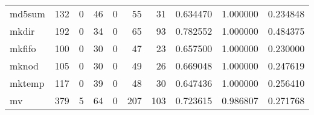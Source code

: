 \begin{longtable}{lrrrrrrrrr}
md5sum    &                                                132 &                                                  0 &                                                 46 &                                                  0 &                                                 55 &                                                 31 &                                           0.634470 &                               1.000000 &                             0.234848 \\
mkdir     &                                                192 &                                                  0 &                                                 34 &                                                  0 &                                                 65 &                                                 93 &                                           0.782552 &                               1.000000 &                             0.484375 \\
mkfifo    &                                                100 &                                                  0 &                                                 30 &                                                  0 &                                                 47 &                                                 23 &                                           0.657500 &                               1.000000 &                             0.230000 \\
mknod     &                                                105 &                                                  0 &                                                 30 &                                                  0 &                                                 49 &                                                 26 &                                           0.669048 &                               1.000000 &                             0.247619 \\
mktemp    &                                                117 &                                                  0 &                                                 39 &                                                  0 &                                                 48 &                                                 30 &                                           0.647436 &                               1.000000 &                             0.256410 \\
mv        &                                                379 &                                                  5 &                                                 64 &                                                  0 &                                                207 &                                                103 &                                           0.723615 &                               0.986807 &                             0.271768 \\

\end{longtable}
